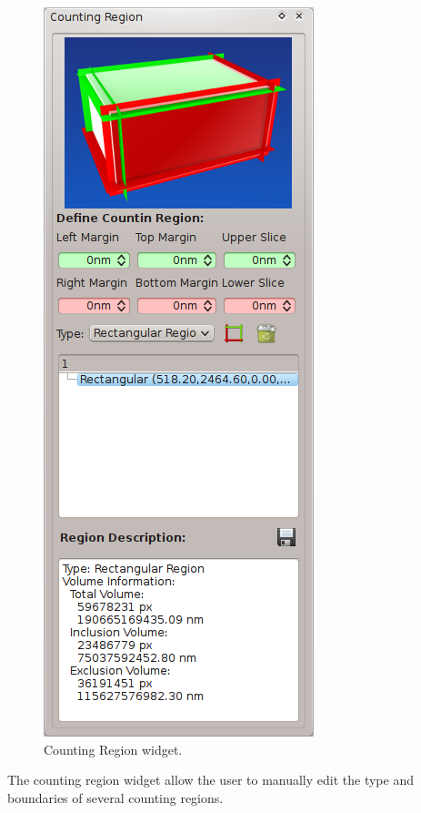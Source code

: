 \begin{figure}[H]
\centering
\includegraphics[scale=0.5]{fig/plugin-ct-widget.png}
\caption{Counting Region widget.}
\end{figure}

The counting region widget allow the user to manually edit the type and boundaries of several
counting regions.\\

